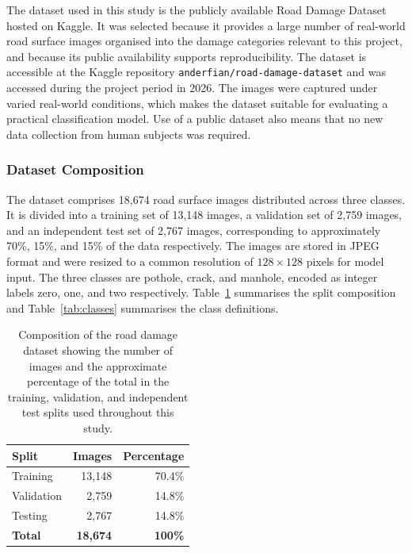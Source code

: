 \documentclass[preprint,12pt]{elsarticle}
\begin{document}
The dataset used in this study is the publicly available Road Damage Dataset hosted on Kaggle.
It was selected because it provides a large number of real-world road surface images organised into the damage categories relevant to this project, and because its public availability supports reproducibility.
The dataset is accessible at the Kaggle repository \texttt{anderfian/road-damage-dataset} and was accessed during the project period in 2026.
The images were captured under varied real-world conditions, which makes the dataset suitable for evaluating a practical classification model.
Use of a public dataset also means that no new data collection from human subjects was required.

\subsubsection{Dataset Composition}

The dataset comprises 18{,}674 road surface images distributed across three classes.
It is divided into a training set of 13{,}148 images, a validation set of 2{,}759 images, and an independent test set of 2{,}767 images, corresponding to approximately 70\%, 15\%, and 15\% of the data respectively.
The images are stored in JPEG format and were resized to a common resolution of $128 \times 128$ pixels for model input.
The three classes are pothole, crack, and manhole, encoded as integer labels zero, one, and two respectively.
Table~\ref{tab:dataset} summarises the split composition and Table~\ref{tab:classes} summarises the class definitions.

\begin{table}[!ht]
\centering
\caption{Composition of the road damage dataset showing the number of images and the approximate percentage of the total in the training, validation, and independent test splits used throughout this study.}
\label{tab:dataset}
\begin{tabular}{lrr}
\toprule
\textbf{Split} & \textbf{Images} & \textbf{Percentage} \\
\midrule
Training   & 13{,}148 & 70.4\% \\
Validation & 2{,}759  & 14.8\% \\
Testing    & 2{,}767  & 14.8\% \\
\midrule
\textbf{Total} & \textbf{18{,}674} & \textbf{100\%} \\
\bottomrule
\end{tabular}
\end{table}
\end{document}
